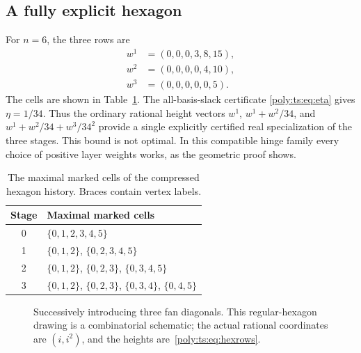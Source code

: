 \documentclass[11pt,a4paper]{article}
\numberwithin{equation}{section}
\theoremstyle{plain}
\begin{document}
\subsection{A fully explicit hexagon}
For $n=6$, the three rows are
\begin{equation}\label{poly:ts:eq:hexrows}
 \begin{split}
 w^1&=(0,0,0,3,8,15),\\
 w^2&=(0,0,0,0,4,10),\\
 w^3&=(0,0,0,0,0,5).
 \end{split}
\end{equation}
The cells are shown in Table~\ref{poly:ts:tab:hex}. The all-basis-slack certificate
\eqref{poly:ts:eq:eta} gives $\eta=1/34$. Thus the ordinary rational height
vectors $w^1$, $w^1+w^2/34$, and $w^1+w^2/34+w^3/34^2$ provide a
single explicitly certified real specialization of the three stages.
This bound is not optimal. In this compatible hinge family every choice
of positive layer weights works, as the geometric proof shows.

\begin{table}[htbp]
\centering
\caption{The maximal marked cells of the compressed hexagon history.
Braces contain vertex labels.}\label{poly:ts:tab:hex}
\begin{tabular}{@{}cl@{}}
\toprule
Stage & Maximal marked cells\\
\midrule
0 & $\{0,1,2,3,4,5\}$\\
1 & $\{0,1,2\}$, $\{0,2,3,4,5\}$\\
2 & $\{0,1,2\}$, $\{0,2,3\}$, $\{0,3,4,5\}$\\
3 & $\{0,1,2\}$, $\{0,2,3\}$, $\{0,3,4\}$, $\{0,4,5\}$\\
\bottomrule
\end{tabular}
\end{table}

\begin{figure}[htbp]
\centering
{}
\caption{Successively introducing three fan diagonals. This regular-hexagon
drawing is a combinatorial schematic; the actual rational coordinates are
$(i,i^2)$, and the heights are~\eqref{poly:ts:eq:hexrows}.}\label{poly:ts:fig:fan}
\end{figure}
\end{document}
